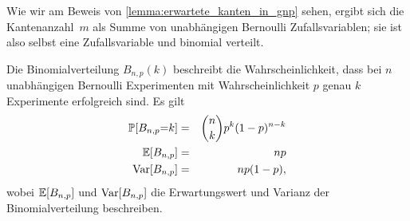 Wie wir am Beweis von \cref{lemma:erwartete_kanten_in_gnp} sehen, ergibt sich die Kantenanzahl~$m$ als Summe von unabhängigen Bernoulli Zufallsvariablen;
sie ist also selbst eine Zufallsvariable und binomial verteilt.
\begin{definition}
    Die  Binomialverteilung $B_{n, p}(k)$ beschreibt die Wahrscheinlichkeit, dass bei $n$ unabhängigen Bernoulli Experimenten mit Wahrscheinlichkeit $p$ genau $k$ Experimente erfolgreich sind.
    Es gilt 
    \begin{eqnarray*}
        \mathbb{P}\!\left[B_{n,p} {=} k\right] &=& \binom{n}{k} p^k (1-p)^{n-k} \\
        \mathbb{E}\!\left[B_{n,p}\right] &=& np \\
        \operatorname{Var}\!\left[B_{n,p}\right] &=& np(1-p),
    \end{eqnarray*}
    wobei $\mathbb{E}\!\left[B_{n,p}\right]$ und $\operatorname{Var}\!\left[B_{n,p}\right]$ die Erwartungswert und Varianz der Binomialverteilung beschreiben.
\end{definition}

